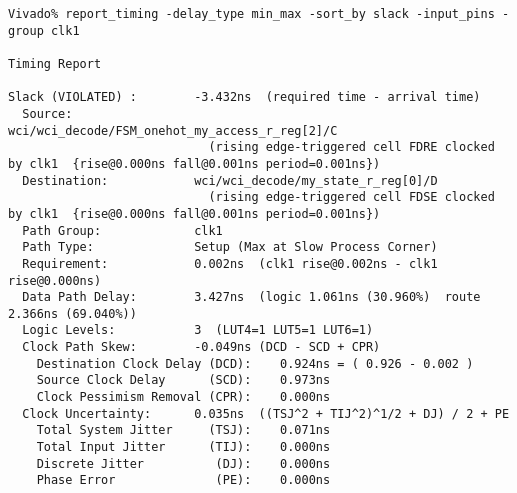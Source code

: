 \documentclass{article}
\begin{document}
\begin{lstlisting}
Vivado% report_timing -delay_type min_max -sort_by slack -input_pins -group clk1

Timing Report

Slack (VIOLATED) :        -3.432ns  (required time - arrival time)
  Source:                 wci/wci_decode/FSM_onehot_my_access_r_reg[2]/C
                            (rising edge-triggered cell FDRE clocked by clk1  {rise@0.000ns fall@0.001ns period=0.001ns})
  Destination:            wci/wci_decode/my_state_r_reg[0]/D
                            (rising edge-triggered cell FDSE clocked by clk1  {rise@0.000ns fall@0.001ns period=0.001ns})
  Path Group:             clk1
  Path Type:              Setup (Max at Slow Process Corner)
  Requirement:            0.002ns  (clk1 rise@0.002ns - clk1 rise@0.000ns)
  Data Path Delay:        3.427ns  (logic 1.061ns (30.960%)  route 2.366ns (69.040%))
  Logic Levels:           3  (LUT4=1 LUT5=1 LUT6=1)
  Clock Path Skew:        -0.049ns (DCD - SCD + CPR)
    Destination Clock Delay (DCD):    0.924ns = ( 0.926 - 0.002 ) 
    Source Clock Delay      (SCD):    0.973ns
    Clock Pessimism Removal (CPR):    0.000ns
  Clock Uncertainty:      0.035ns  ((TSJ^2 + TIJ^2)^1/2 + DJ) / 2 + PE
    Total System Jitter     (TSJ):    0.071ns
    Total Input Jitter      (TIJ):    0.000ns
    Discrete Jitter          (DJ):    0.000ns
    Phase Error              (PE):    0.000ns


\end{lstlisting}
\end{document}

